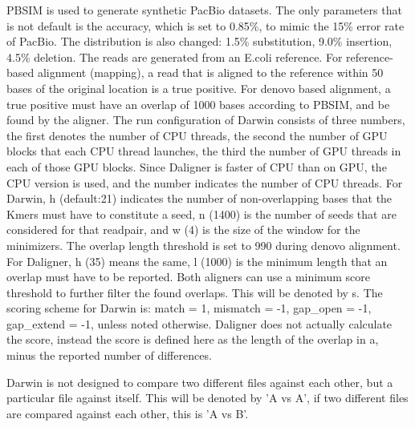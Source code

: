 \documentclass[../main/thesis.tex]{subfiles}
\begin{document}
PBSIM \cite{PBSIM} is used to generate synthetic PacBio datasets.
The only parameters that is not default is the accuracy, which is set to 0.85\%, to mimic the 15\% error rate of PacBio.
The distribution is also changed: 1.5\% substitution, 9.0\% insertion, 4.5\% deletion.
The reads are generated from an E.coli reference.
For reference-based alignment (mapping), a read that is aligned to the reference within 50 bases of the original location is a true positive.
For denovo based alignment, a true positive must have an overlap of 1000 bases according to PBSIM, and be found by the aligner.
The run configuration of Darwin consists of three numbers, the first denotes the number of CPU threads, the second the number of GPU blocks that each CPU thread launches, the third the number of GPU threads in each of those GPU blocks.
Since Daligner is faster of CPU than on GPU, the CPU version is used, and the number indicates the number of CPU threads.
For Darwin, h (default:21) indicates the number of non-overlapping bases that the Kmers must have to constitute a seed, n (1400) is the number of seeds that are considered for that readpair, and w (4) is the size of the window for the minimizers.
The overlap length threshold is set to 990 during denovo alignment.
For Daligner, h (35) means the same, l (1000) is the minimum length that an overlap must have to be reported.
Both aligners can use a minimum score threshold to further filter the found overlaps.
This will be denoted by s.
The scoring scheme for Darwin is: match = 1, mismatch = -1, gap\_open = -1, gap\_extend = -1, unless noted otherwise.
Daligner does not actually calculate the score, instead the score is defined here as the length of the overlap in a, minus the reported number of differences.

Darwin is not designed to compare two different files against each other, but a particular file against itself.
This will be denoted by 'A vs A', if two different files are compared against each other, this is 'A vs B'.




\end{document}

